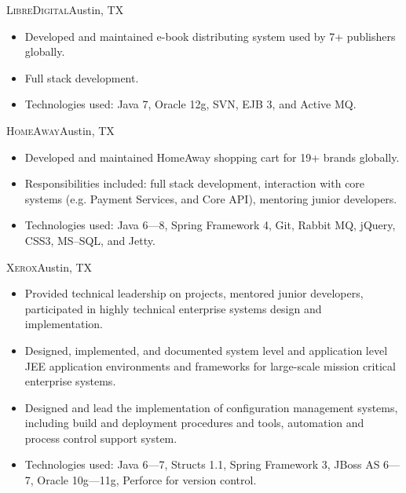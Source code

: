 \documentclass[11pt,letterpaper,sans]{moderncv}
\begin{document}
     {\textsc{LibreDigital}}{Austin, TX}{}
     {\begin{itemize}
         \item Developed and maintained e-book distributing system
               used by 7+ publishers globally.
         \item Full stack development.
         \item Technologies used: Java 7, Oracle 12g, SVN, EJB 3, and
               Active MQ.
     \end{itemize}}

     {\textsc{HomeAway}}{Austin, TX}{}
     {\begin{itemize}
         \item Developed and maintained HomeAway shopping cart for 19+
               brands globally.
         \item Responsibilities included: full stack development, interaction
               with core systems (e.g. Payment Services, and Core API),
               mentoring junior developers.
         \item Technologies used: Java 6---8, Spring Framework 4, Git,
               Rabbit MQ, jQuery, CSS3, MS--SQL, and Jetty.
     \end{itemize}}

     {\textsc{Xerox}}{Austin, TX}{}
     {\begin{itemize}
         \item Provided technical leadership on projects, mentored junior
               developers, participated in highly technical enterprise
               systems design and implementation.
         \item Designed, implemented, and documented system level and
               application level JEE application environments and frameworks
               for large-scale mission critical enterprise systems.
         \item Designed and lead the implementation of configuration
               management systems, including build and deployment procedures
               and tools, automation and process control support system.
         \item Technologies used: Java 6---7, Structs 1.1, Spring Framework
               3, JBoss AS 6---7, Oracle 10g---11g, Perforce for version
               control.
     \end{itemize}}
\end{document}
